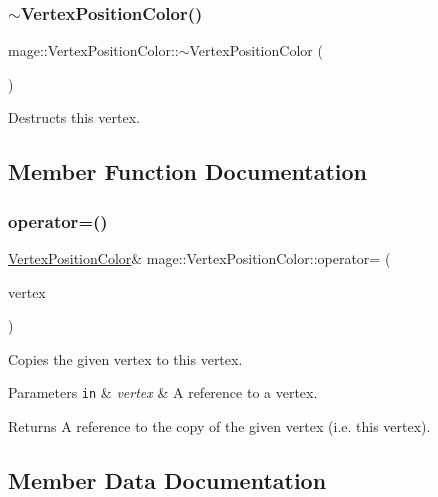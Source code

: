 \subsubsection{\texorpdfstring{$\sim$\+Vertex\+Position\+Color()}{~VertexPositionColor()}}
{\footnotesize\ttfamily mage\+::\+Vertex\+Position\+Color\+::$\sim$\+Vertex\+Position\+Color (\begin{DoxyParamCaption}{ }\end{DoxyParamCaption})\hspace{0.3cm}{\ttfamily [default]}}

Destructs this vertex. 

\subsection{Member Function Documentation}
\hypertarget{structmage_1_1_vertex_position_color_aa621ed54ab2eee82d636a5805db5d28b}{}\label{structmage_1_1_vertex_position_color_aa621ed54ab2eee82d636a5805db5d28b} 
\subsubsection{\texorpdfstring{operator=()}{operator=()}}
{\footnotesize\ttfamily \hyperlink{structmage_1_1_vertex_position_color}{Vertex\+Position\+Color}\& mage\+::\+Vertex\+Position\+Color\+::operator= (\begin{DoxyParamCaption}\item[{const \hyperlink{structmage_1_1_vertex_position_color}{Vertex\+Position\+Color} \&}]{vertex }\end{DoxyParamCaption})\hspace{0.3cm}{\ttfamily [default]}}

Copies the given vertex to this vertex.


\begin{DoxyParams}[1]{Parameters}
\mbox{\tt in}  & {\em vertex} & A reference to a vertex. \\
\hline
\end{DoxyParams}
\begin{DoxyReturn}{Returns}
A reference to the copy of the given vertex (i.\+e. this vertex). 
\end{DoxyReturn}


\subsection{Member Data Documentation}
\hypertarget{structmage_1_1_vertex_position_color_a4a9e50e66f73e93a9a529c0c940e2458}{}\label{structmage_1_1_vertex_position_color_a4a9e50e66f73e93a9a529c0c940e2458} 
